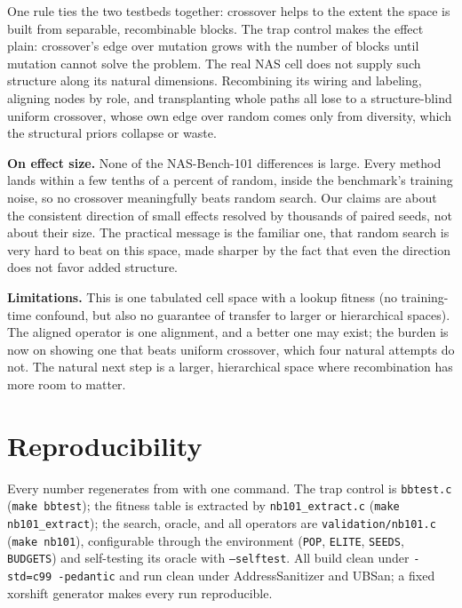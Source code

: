 \documentclass[11pt]{article}
\begin{document}
One rule ties the two testbeds together: crossover helps to the extent the space is built from
separable, recombinable blocks. The trap control makes the effect plain: crossover's edge over
mutation grows with the number of blocks until mutation cannot solve the problem. The real NAS
cell does not supply such structure along its natural dimensions. Recombining its wiring and
labeling, aligning nodes by role, and transplanting whole paths all lose to a structure-blind
uniform crossover, whose own edge over random comes only from diversity, which the structural
priors collapse or waste.

\textbf{On effect size.} None of the NAS-Bench-101 differences is large. Every method lands
within a few tenths of a percent of random, inside the benchmark's training noise, so no
crossover meaningfully beats random search. Our claims are about the consistent direction of
small effects resolved by thousands of paired seeds, not about their size. The practical message
is the familiar one, that random search is very hard to beat on this space, made sharper by the
fact that even the direction does not favor added structure.

\textbf{Limitations.} This is one tabulated cell space with a lookup fitness (no training-time
confound, but also no guarantee of transfer to larger or hierarchical spaces). The aligned
operator is one alignment, and a better one may exist; the burden is now on showing one that
beats uniform crossover, which four natural attempts do not. The natural next step is a larger,
hierarchical space where recombination has more room to matter.

\section*{Reproducibility}

Every number regenerates from \cite{repo} with one command. The trap control is
\texttt{bbtest.c} (\texttt{make bbtest}); the fitness table is extracted by
\texttt{nb101\_extract.c} (\texttt{make nb101\_extract}); the search, oracle, and all operators
are \texttt{validation/nb101.c} (\texttt{make nb101}), configurable through the environment
(\texttt{POP}, \texttt{ELITE}, \texttt{SEEDS}, \texttt{BUDGETS}) and self-testing its oracle
with \texttt{--selftest}. All build clean under \texttt{-std=c99 -pedantic} and run clean under
AddressSanitizer and UBSan; a fixed xorshift generator makes every run reproducible.
\end{document}
